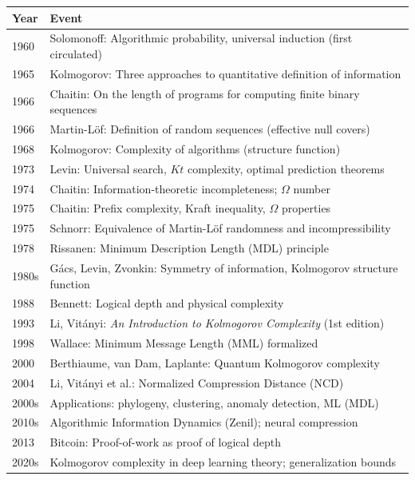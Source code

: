 \begin{tabularx}{\linewidth}{|l|X|}
\hline
\textbf{Year} & \textbf{Event} \\ \hline
1960 & Solomonoff: Algorithmic probability, universal induction (first circulated) \\ \hline
1965 & Kolmogorov: Three approaches to quantitative definition of information \\ \hline
1966 & Chaitin: On the length of programs for computing finite binary sequences \\ \hline
1966 & Martin-L\"of: Definition of random sequences (effective null covers) \\ \hline
1968 & Kolmogorov: Complexity of algorithms (structure function) \\ \hline
1973 & Levin: Universal search, $Kt$ complexity, optimal prediction theorems \\ \hline
1974 & Chaitin: Information-theoretic incompleteness; $\Omega$ number \\ \hline
1975 & Chaitin: Prefix complexity, Kraft inequality, $\Omega$ properties \\ \hline
1975 & Schnorr: Equivalence of Martin-L\"of randomness and incompressibility \\ \hline
1978 & Rissanen: Minimum Description Length (MDL) principle \\ \hline
1980s & G\'acs, Levin, Zvonkin: Symmetry of information, Kolmogorov structure function \\ \hline
1988 & Bennett: Logical depth and physical complexity \\ \hline
1993 & Li, Vit\'anyi: \emph{An Introduction to Kolmogorov Complexity} (1st edition) \\ \hline
1998 & Wallace: Minimum Message Length (MML) formalized \\ \hline
2000 & Berthiaume, van Dam, Laplante: Quantum Kolmogorov complexity \\ \hline
2004 & Li, Vit\'anyi et al.: Normalized Compression Distance (NCD) \\ \hline
2000s & Applications: phylogeny, clustering, anomaly detection, ML (MDL) \\ \hline
2010s & Algorithmic Information Dynamics (Zenil); neural compression \\ \hline
2013 & Bitcoin: Proof-of-work as proof of logical depth \\ \hline
2020s & Kolmogorov complexity in deep learning theory; generalization bounds \\ \hline
\end{tabularx}


